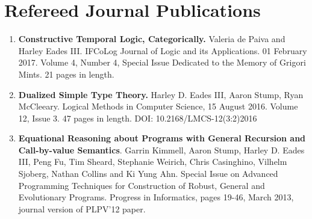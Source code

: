 \documentclass[11pt]{article}
\begin{document}
  \section{Refereed Journal Publications}
  \begin{enumerate}
  \item[] \textbf{Constructive Temporal Logic, Categorically.} Valeria
    de Paiva and Harley Eades III.  IFCoLog Journal of Logic and its
    Applications. 01 February 2017. Volume 4, Number 4, Special Issue
    Dedicated to the Memory of Grigori Mints.  21 pages in length.

  \item[] \textbf{Dualized Simple Type Theory.} Harley D. Eades III, Aaron
    Stump, Ryan McCleeary. Logical Methods in Computer Science, 15
    August 2016. Volume 12, Issue 3. 47 pages in length.
    DOI: 10.2168/LMCS-12(3:2)2016    

  \item[] \textbf{Equational Reasoning about Programs with General
    Recursion and Call-by-value Semantics}.  Garrin Kimmell, Aaron
    Stump, Harley D. Eades III, Peng Fu, Tim Sheard, Stephanie Weirich,
    Chris Casinghino, Vilhelm Sjoberg, Nathan Collins and Ki Yung Ahn.
    Special Issue on Advanced Programming Techniques for Construction of
    Robust, General and Evolutionary Programs. Progress in Informatics,
    pages 19-46, March 2013, journal version of PLPV’12 paper.

  \end{enumerate}
\end{document}
